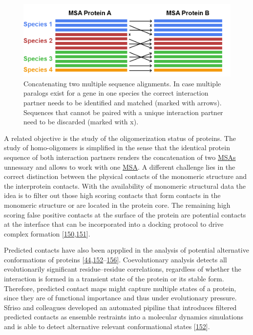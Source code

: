 \documentclass[11pt,a4paper,twoside]{book}
\theoremstyle{definition}
\theoremstyle{definition}
\theoremstyle{remark}
\begin{document}
\begin{figure}

{\centering \includegraphics[width=1\linewidth]{img/intro/matching_sequences_ppi} 

}

\caption{Concatenating two multiple sequence
alignments. In case multiple paralogs exist for a gene in one species
the correct interaction partner needs to be identified and matched
(marked with arrows). Sequences that cannot be paired with a unique
interaction partner need to be discarded (marked with x).}\label{fig:matching-sequences-ppi}
\end{figure}

A related objective is the study of the oligomerization status of
proteins. The study of homo-oligomers is simplified in the sense that
the identical protein sequence of both interaction partners renders the
concatenation of two \protect\hyperlink{abbrev}{MSAs} unnessary and
allows to work with one \protect\hyperlink{abbrev}{MSA}. A different
challenge lies in the correct distinction between the physical contacts
of the monomeric structure and the interprotein contacts. With the
availability of monomeric structural data the idea is to filter out
those high scoring contacts that form contacts in the monomeric
structure or are located in the protein core. The remaining high scoring
false positive contacts at the surface of the protein are potential
contacts at the interface that can be incorporated into a docking
protocol to drive complex formation
{[}\protect\hyperlink{ref-Uguzzoni2017}{150},\protect\hyperlink{ref-DosSantos2015a}{151}{]}.

Predicted contacts have also been appplied in the analysis of potential
alternative conformations of proteins
{[}\protect\hyperlink{ref-Parisi2015a}{44},\protect\hyperlink{ref-Sfriso2016}{152}--\protect\hyperlink{ref-Jeon2011a}{156}{]}.
Coevolutionary analysis detects all evolutionarily significant
residue--residue correlations, regardless of whether the interaction is
formed in a transient state of the protein or its stable form.
Therefore, predicted contact maps might capture multiple states of a
protein, since they are of functional importance and thus under
evolutionary pressure. Sfriso and colleagues developed an automated
pipiline that introduces filtered predicted contacts as ensemble
restraints into a molecular dynamics simulations and is able to detect
alternative relevant conformational states
{[}\protect\hyperlink{ref-Sfriso2016}{152}{]}.
\end{document}
